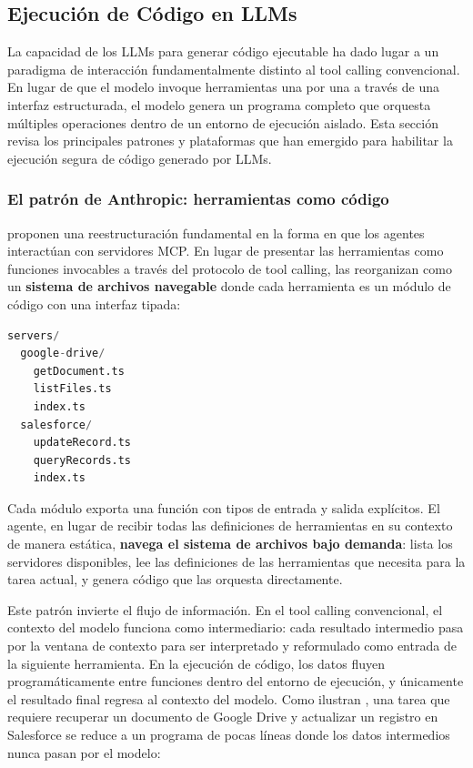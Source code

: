 \subsection{Ejecución de Código en LLMs}

La capacidad de los LLMs para generar código ejecutable ha dado lugar a un
paradigma de interacción fundamentalmente distinto al tool calling
convencional. En lugar de que el modelo invoque herramientas una por una a
través de una interfaz estructurada, el modelo genera un programa completo que
orquesta múltiples operaciones dentro de un entorno de ejecución aislado. Esta
sección revisa los principales patrones y plataformas que han emergido para
habilitar la ejecución segura de código generado por LLMs.

\subsubsection{El patrón de Anthropic: herramientas como código}

\citet{anthropic2024codeexec} proponen una reestructuración fundamental en la
forma en que los agentes interactúan con servidores MCP. En lugar de presentar
las herramientas como funciones invocables a través del protocolo de tool
calling, las reorganizan como un \textbf{sistema de archivos navegable} donde
cada herramienta es un módulo de código con una interfaz tipada:

\begin{lstlisting}[language=Python,caption={Estructura de herramientas como archivos}]
servers/
  google-drive/
    getDocument.ts
    listFiles.ts
    index.ts
  salesforce/
    updateRecord.ts
    queryRecords.ts
    index.ts
\end{lstlisting}

Cada módulo exporta una función con tipos de entrada y salida explícitos. El
agente, en lugar de recibir todas las definiciones de herramientas en su
contexto de manera estática, \textbf{navega el sistema de archivos bajo
demanda}: lista los servidores disponibles, lee las definiciones de las
herramientas que necesita para la tarea actual, y genera código que las
orquesta directamente.

Este patrón invierte el flujo de información. En el tool calling convencional,
el contexto del modelo funciona como intermediario: cada resultado intermedio
pasa por la ventana de contexto para ser interpretado y reformulado como
entrada de la siguiente herramienta. En la ejecución de código, los datos
fluyen programáticamente entre funciones dentro del entorno de ejecución, y
únicamente el resultado final regresa al contexto del modelo. Como ilustran
\citet{anthropic2024codeexec}, una tarea que requiere recuperar un documento de
Google Drive y actualizar un registro en Salesforce se reduce a un programa de
pocas líneas donde los datos intermedios nunca pasan por el modelo:

